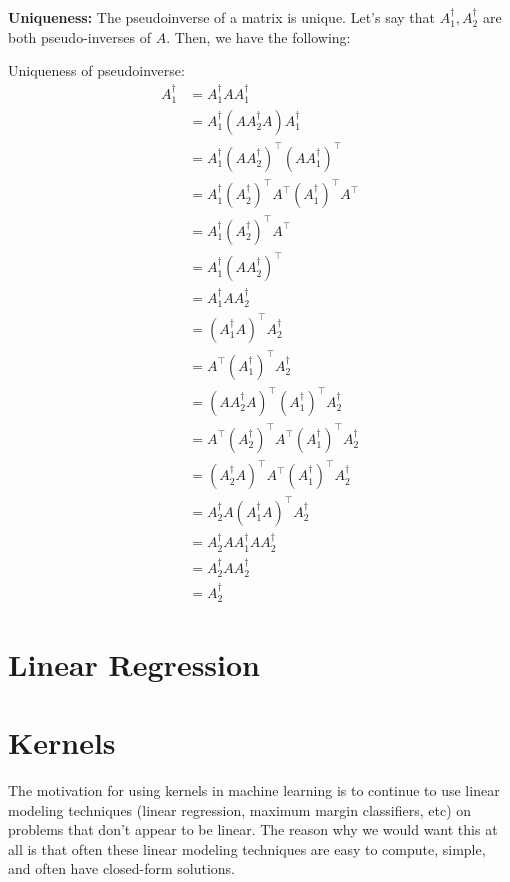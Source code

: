 \documentclass[answers,12pt]{exam}
\begin{document}
\textbf{Uniqueness:} 
The pseudoinverse of a matrix is unique.
Let's say that $A_1^{\dagger}, A_2^{\dagger}$ are both pseudo-inverses of $A$.
Then, we have the following:
\begin{solution}
    Uniqueness of pseudoinverse:
    \begin{align*}
        A_1^{\dagger} &= A_1^{\dagger} A A_1^{\dagger} \\
        &= A_1^{\dagger} (A A_2^{\dagger} A) A_1^{\dagger} \\
        &= A_1^{\dagger} {(A A_2^{\dagger})}^{\top} {(A A_1^{\dagger})}^{\top} \\
        &= A_1^{\dagger} {(A_2^{\dagger})}^{\top} A^{\top} {(A_1^{\dagger})}^{\top} A^{\top} \\
        &= A_1^{\dagger} {(A_2^{\dagger})}^{\top} A^{\top} \\
        &= A_1^{\dagger} {(A A_2^{\dagger})}^{\top} \\
        &= A_1^{\dagger} A A_2^{\dagger} \\
        &= {(A_1^{\dagger} A)}^{\top} A_2^{\dagger} \\
        &= A^{\top} {(A_1^{\dagger})}^{\top} A_2^{\dagger} \\
        &= {(A A_2^{\dagger} A)}^{\top} {(A_1^{\dagger})}^{\top} A_2^{\dagger} \\
        &= A^{\top} {(A_2^{\dagger})}^{\top} A^{\top} {(A_1^{\dagger})}^{\top} A_2^{\dagger} \\
        &= {(A_2^{\dagger} A)}^{\top} A^{\top} {(A_1^{\dagger})}^{\top} A_2^{\dagger} \\
        &= A_2^{\dagger} A {(A_1^{\dagger} A)}^{\top} A_2^{\dagger} \\
        &= A_2^{\dagger} A A_1^{\dagger} A A_2^{\dagger} \\
        &= A_2^{\dagger} A A_2^{\dagger} \\
        &= A_2^{\dagger}
    \end{align*}
\end{solution}

\section{Linear Regression}

\section{Kernels}
The motivation for using kernels in machine learning is to continue to use linear modeling techniques (linear regression, maximum margin classifiers, etc) on problems that don't appear to be linear.
The reason why we would want this at all is that often these linear modeling techniques are easy to compute, simple, and often have closed-form solutions.
\end{document}
